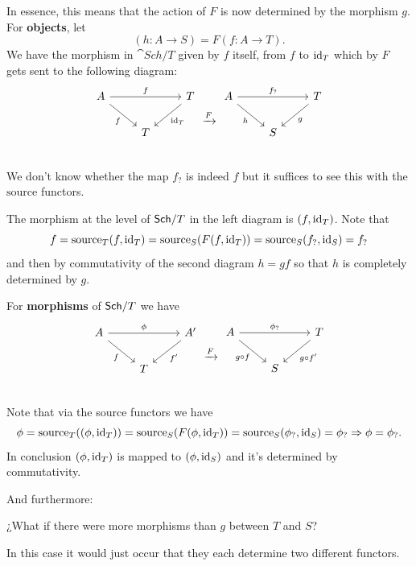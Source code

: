\documentclass[12pt]{memoir}
\begin{document}
\begin{ptcb}
    In essence, this means that the action of \(F\) is now determined by the morphism \(g\). For \textbf{objects}, let
    \[
        (h:A\to S)=F(f:A\to T).
    \]
    We have the morphism in \(\cat{Sch/T}\) given by \(f\) itself, from \(f\) to \(\operatorname{id}_T\) which by \(F\) gets sent to the following diagram:
    \[
    \begin{tikzcd}
        A\arrow[dr,"f"'] \arrow[rr,"f"] && T\arrow[dl,"\id_T"] \\
        & T  \\
    \end{tikzcd}
    \xrightarrow{F}
    \begin{tikzcd}
        A\arrow[dr,"h"'] \arrow[rr,"f_?"] && T\arrow[dl,"g"] \\
        & S  \\
    \end{tikzcd}
    \]
    We don't know whether the map \(f_?\) is indeed \(f\) but it suffices to see this with the \(\text{source}\) functors.\par
    The morphism at the level of \(\mathsf{Sch}/T\) in the left diagram is \((f,\operatorname{id}_T)\). Note that 
    \[
        f=\text{source}_T(f,\operatorname{id}_T)=\text{source}_S(F(f,\operatorname{id}_T))=\text{source}_S(f_?,\operatorname{id}_S)=f_?
    \]
    and then by commutativity of the second diagram \(h=gf\) so that \(h\) is completely determined by \(g\).\par
    For \textbf{morphisms} of \(\mathsf{Sch}/T\) we have 
    \[
    \begin{tikzcd}
        A\arrow[dr,"f"'] \arrow[rr,"\phi"] && A'\arrow[dl,"f'"] \\
        & T  \\
    \end{tikzcd}
    \xrightarrow{F}
    \begin{tikzcd}
        A\arrow[dr,"g\circ f"'] \arrow[rr,"\phi_?"] && T\arrow[dl,"g\circ f'"] \\
        & S  \\
    \end{tikzcd}
    \]
    Note that via the source functors we have 
    \[
        \phi=\operatorname{source}_T((\phi,\mathrm{id}_T))=\text{source}_S(F(\phi,\operatorname{id}_T))=\text{source}_S(\phi_?,\operatorname{id}_S)=\phi_?\Rightarrow \phi=\phi_?. 
    \]
    In conclusion \((\phi,\operatorname{id}_T)\) is mapped to \((\phi,\operatorname{id}_S)\) and it's determined by commutativity.
    \tcbline 

    And furthermore:
    \begin{Qn}
        ¿What if there were more morphisms than \(g\) between \(T\) and \(S\)?
    \end{Qn}

    In this case it would just occur that they each determine two different functors. 
\end{ptcb}
\end{document}
